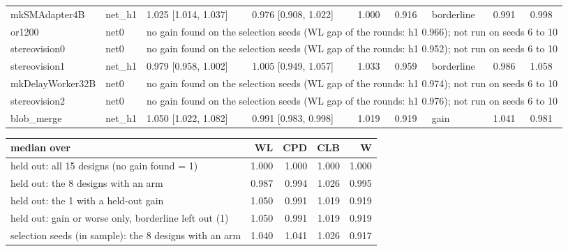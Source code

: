 \begin{table}[t]
\begin{tabular}{@{}lllllllll@{}}
mkSMAdapter4B & net\_h1 & 1.025 [1.014, 1.037] & 0.976 [0.908, 1.022] & 1.000 & 0.916 & borderline & 0.991 & 0.998 \\
or1200 & net0 & \multicolumn{7}{l}{no gain found on the selection seeds (WL gap of the rounds: h1 0.966); not run on seeds 6 to 10} \\
stereovision0 & net0 & \multicolumn{7}{l}{no gain found on the selection seeds (WL gap of the rounds: h1 0.952); not run on seeds 6 to 10} \\
stereovision1 & net\_h1 & 0.979 [0.958, 1.002] & 1.005 [0.949, 1.057] & 1.033 & 0.959 & borderline & 0.986 & 1.058 \\
mkDelayWorker32B & net0 & \multicolumn{7}{l}{no gain found on the selection seeds (WL gap of the rounds: h1 0.974); not run on seeds 6 to 10} \\
stereovision2 & net0 & \multicolumn{7}{l}{no gain found on the selection seeds (WL gap of the rounds: h1 0.976); not run on seeds 6 to 10} \\
blob\_merge & net\_h1 & 1.050 [1.022, 1.082] & 0.991 [0.983, 0.998] & 1.019 & 0.919 & gain & 1.041 & 0.981 \\
\bottomrule
\end{tabular}
\medskip
\begin{tabular}{@{}lrrrr@{}}
\toprule
median over & WL & CPD & CLB & W \\
\midrule
held out: all 15 designs (no gain found = 1) & 1.000 & 1.000 & 1.000 & 1.000 \\
held out: the 8 designs with an arm & 0.987 & 0.994 & 1.026 & 0.995 \\
held out: the 1 with a held-out gain & 1.050 & 0.991 & 1.019 & 0.919 \\
held out: gain or worse only, borderline left out (1) & 1.050 & 0.991 & 1.019 & 0.919 \\
selection seeds (in sample): the 8 designs with an arm & 1.040 & 1.041 & 1.026 & 0.917 \\
\bottomrule
\end{tabular}
\end{table}


